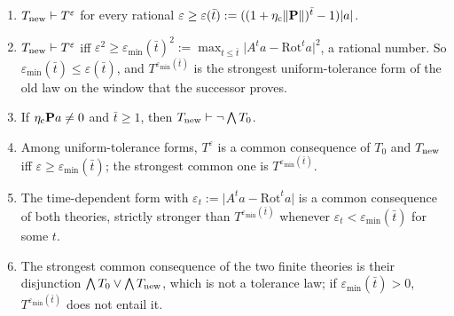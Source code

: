 \begin{proposition}\label{prop:laws:correction}
\leavevmode
\begin{enumerate}[label=(\alph*),itemsep=1pt,topsep=2pt]
\item $T_{\rm new}\vdash T^\varepsilon$ for every rational $\varepsilon\ge\varepsilon(\bar t):=((1+\eta_{\rm c}\lVert\mathbf P\rVert)^{\bar t}-1)\lvert a\rvert$.
\item $T_{\rm new}\vdash T^\varepsilon$ iff $\varepsilon^2\ge\varepsilon_{\min}(\bar t)^2:=\max_{t\le\bar t}\lvert A^ta-\mathrm{Rot}^ta\rvert^2$, a rational number. So $\varepsilon_{\min}(\bar t)\le\varepsilon(\bar t)$, and $T^{\varepsilon_{\min}(\bar t)}$ is the strongest uniform-tolerance form of the old law on the window that the successor proves.
\item If $\eta_{\rm c}\mathbf Pa\ne0$ and $\bar t\ge1$, then $T_{\rm new}\vdash\neg\bigwedge T_0$.
\item Among uniform-tolerance forms, $T^\varepsilon$ is a common consequence of $T_0$ and $T_{\rm new}$ iff $\varepsilon\ge\varepsilon_{\min}(\bar t)$; the strongest common one is $T^{\varepsilon_{\min}(\bar t)}$.
\item The time-dependent form with $\varepsilon_t:=\lvert A^ta-\mathrm{Rot}^ta\rvert$ is a common consequence of both theories, strictly stronger than $T^{\varepsilon_{\min}(\bar t)}$ whenever $\varepsilon_t<\varepsilon_{\min}(\bar t)$ for some $t$.
\item The strongest common consequence of the two finite theories is their disjunction $\bigwedge T_0\vee\bigwedge T_{\rm new}$, which is not a tolerance law; if $\varepsilon_{\min}(\bar t)>0$, $T^{\varepsilon_{\min}(\bar t)}$ does not entail it.
\end{enumerate}
\end{proposition}


